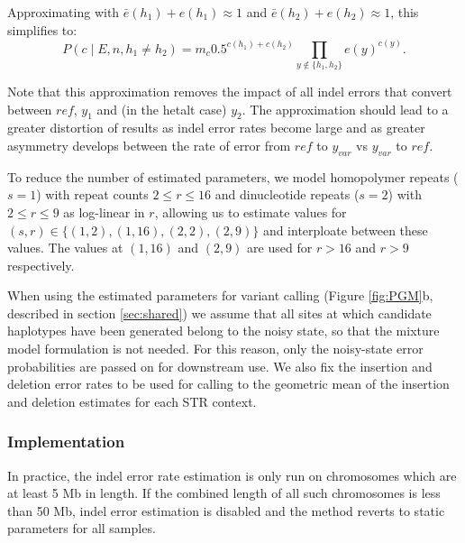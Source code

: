\documentclass{article}
\begin{document}
Approximating with $\bar{e}(h_1) + e(h_1) \approx 1$ and $\bar{e}(h_2) + e(h_2) \approx 1$, this simplifies to:
\begin{equation*}
P(c \mid E, n, h_1 \ne h_2) = m_c 0.5^{c(h_1) + c(h_2)} \prod_{y \notin \{h_1, h_2 \}} e(y)^{c(y)}.
\end{equation*}

Note that this approximation removes the impact of all indel errors that convert between $ref$, $y_1$ and (in the hetalt case) $y_2$. The approximation should lead to a greater distortion of results as indel error rates become large and as greater asymmetry develops between the rate of error from $ref$ to $y_{var}$ vs $y_{var}$ to $ref$.

To reduce the number of estimated parameters, we model homopolymer repeats ($s=1$) with repeat counts $2\leq r \leq 16$ and dinucleotide repeats ($s=2$) with $2\leq r \leq 9$ as log-linear in $r$, allowing us to estimate values for $(s,r) \in \{(1,2), (1,16), (2,2), (2,9)\}$ and interploate between these values. The values at $(1,16)$ and $(2,9)$ are used for $r>16$ and $r>9$ respectively.

When using the estimated parameters for variant calling (Figure \ref{fig:PGM}b, described in section \ref{sec:shared}) we assume that all sites at which candidate haplotypes have been generated belong to the noisy state, so that the mixture model formulation is not needed. For this reason, only the noisy-state error probabilities are passed on for downstream use.
We also fix the insertion and deletion error rates to be used for calling to the geometric mean of the insertion and deletion estimates for each STR context.

\subsubsection{Implementation}
\label{sec:error_estimation_implementation}

In practice, the indel error rate estimation is only run on chromosomes which are at least 5 Mb in length. If the combined length of all such chromosomes is less than 50 Mb, indel error estimation is disabled and the method reverts to static parameters for all samples.
\end{document}
